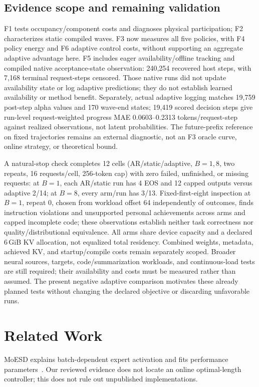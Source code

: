 \documentclass[conference,letterpaper]{IEEEtran}
\begin{document}
\subsection{Evidence scope and remaining validation}
F1 tests occupancy/component costs and diagnoses physical participation; F2 characterizes static compiled waves. F3 now measures all five policies, with F4 policy energy and F6 adaptive control costs, without supporting an aggregate adaptive advantage here. F5 includes eager availability/offline tracking and compiled native acceptance-state observation: 240,254 recovered host steps, with 7,168 terminal request-steps censored. Those native runs did not update availability state or log adaptive predictions; they do not establish learned availability or method benefit. Separately, actual adaptive logging matches 19,759 post-step alpha values and 170 wave-end states; 19,419 scored decision steps give run-level request-weighted progress MAE 0.0603--0.2313 tokens/request-step against realized observations, not latent probabilities. The future-prefix reference on fixed trajectories remains an external diagnostic, not an F3 oracle curve, online strategy, or theoretical bound.

A natural-stop check completes 12 cells (AR/static/adaptive, $B=1,8$, two repeats, 16 requests/cell, 256-token cap) with zero failed, unfinished, or missing requests: at $B=1$, each AR/static run has 4 EOS and 12 capped outputs versus adaptive 2/14; at $B=8$, every arm/run has 3/13. Fixed-first-eight inspection at $B=1$, repeat 0, chosen from workload offset 64 independently of outcomes, finds instruction violations and unsupported personal achievements across arms and capped incomplete code; these observations establish neither task correctness nor quality/distributional equivalence. All arms share device capacity and a declared 6\,GiB KV allocation, not equalized total residency. Combined weights, metadata, achieved KV, and startup/compile costs remain separately scoped. Broader neural sources, targets, code/summarization workloads, and continuous-load tests are still required; their availability and costs must be measured rather than assumed. The present negative adaptive comparison motivates these already planned tests without changing the declared objective or discarding unfavorable runs.

\section{Related Work}
MoESD explains batch-dependent expert activation and fits performance parameters~\cite{moesd}. Our reviewed evidence does not locate an online optimal-length controller; this does not rule out unpublished implementations.
\end{document}
